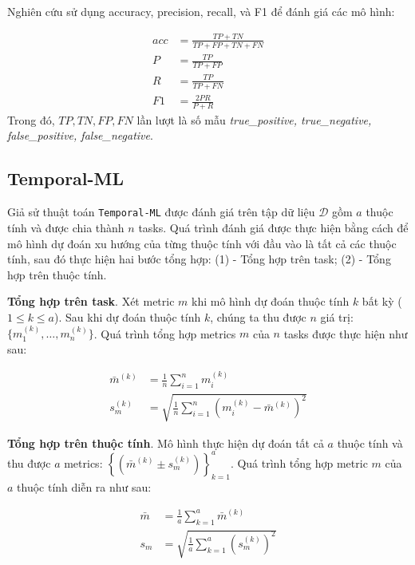 Nghiên cứu sử dụng accuracy, precision, recall, và F1 để đánh giá các mô hình:

\begin{align*}
    acc &= \frac{TP+TN}{TP+FP+TN+FN}\\
    P &= \frac{TP}{TP+FP}\\
    R &= \frac{TP}{TP+FN}\\
    F1 &= \frac{2PR}{P+R}
\end{align*}Trong đó, $TP, TN, FP, FN$ lần lượt là số mẫu \textit{true\_positive, true\_negative, false\_positive, false\_negative}.


\subsection{Temporal-ML}

Giả sử thuật toán \verb|Temporal-ML| được đánh giá trên tập dữ liệu $\mathcal{D}$ gồm $a$ thuộc tính và được chia thành $n$ tasks. Quá trình đánh giá được thực hiện bằng cách để mô hình dự đoán xu hướng của từng thuộc tính với đầu vào là tất cả các thuộc tính, sau đó thực hiện hai bước tổng hợp: (1) - Tổng hợp trên task; (2) - Tổng hợp trên thuộc tính.

\textbf{Tổng hợp trên task}. Xét metric $m$ khi mô hình dự đoán thuộc tính $k$ bất kỳ ($1\leq k \leq a$). Sau khi dự đoán thuộc tính $k$, chúng ta thu được $n$ giá trị: $\{m^{(k)}_1,\dots,m^{(k)}_n\}$. Quá trình tổng hợp metrics $m$ của $n$ tasks được thực hiện như sau:

\begin{align}
    \bar{m}^{(k)} &= \frac{1}{n}\sum_{i=1}^n{m^{(k)}_i} \label{eq:mean_task}\\
    s^{(k)}_m &= \sqrt{\frac{1}{n} \sum_{i=1}^n{(m^{(k)}_i - \bar{m}^{(k)})^2}} \label{eq:std_task}
\end{align}

\textbf{Tổng hợp trên thuộc tính}. Mô hình thực hiện dự đoán tất cả $a$ thuộc tính và thu được $a$ metrics: $\left\{ \left( \bar{m}^{(k)}\pm s^{(k)}_m \right) \right\}_{k=1}^a$. Quá trình tổng hợp metric $m$ của $a$ thuộc tính diễn ra như sau:

\begin{align}
    \bar{m} &= \frac{1}{a}\sum_{k=1}^a{\bar{m}^{(k)}} \label{eq:mean_att}\\
    s_m &= \sqrt{\frac{1}{a} \sum_{k=1}^a{(s^{(k)}_m)^2}} \label{eq:std:att}
\end{align}

